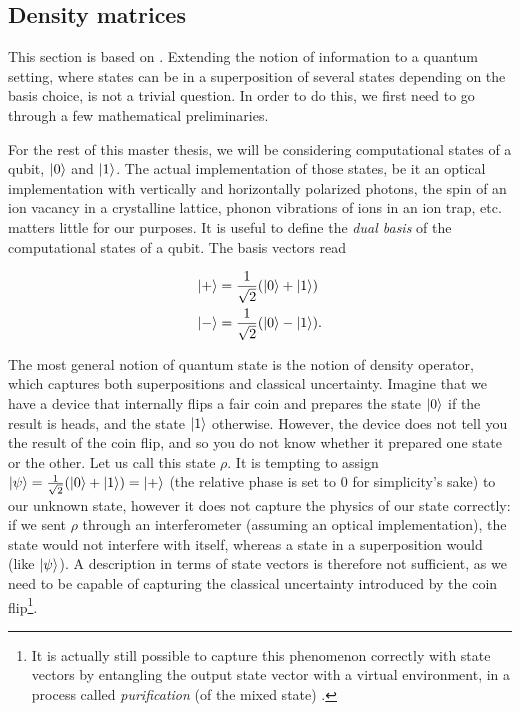 


\subsection{Density matrices} \label{sec:density_matrices}

This section is based on \cite[pp. 98-108]{nielsen_quantum_2010}. Extending the notion of information to a quantum setting, where states can be in a superposition of several states depending on the basis choice, is not a trivial question. In order to do this, we first need to go through a few mathematical preliminaries. 

For the rest of this master thesis, we will be considering computational states of a qubit, $\ket{0}$ and $\ket{1}$. The actual implementation of those states, be it an optical implementation with vertically and horizontally polarized photons, the spin of an ion vacancy in a crystalline lattice, phonon vibrations of ions in an ion trap, etc. matters little for our purposes. It is useful to define the \textit{dual basis} of the computational states of a qubit. The basis vectors read

\begin{align}
    \ket{+} &= \frac{1}{\sqrt{2}} (\ket{0} + \ket{1})\\
    \ket{-} &= \frac{1}{\sqrt{2}} (\ket{0} - \ket{1}).
\end{align}

The most general notion of quantum state is the notion of density operator, which captures both superpositions and classical uncertainty. Imagine that we have a device that internally flips a fair coin and prepares the state $\ket{0}$ if the result is heads, and the state $\ket{1}$ otherwise. However, the device does not tell you the result of the coin flip, and so you do not know whether it prepared one state or the other. Let us call this state $\rho$. It is tempting to assign $\ket{\psi} = \frac{1}{\sqrt{2}}(\ket{0} + \ket{1}) = \ket{+}$ (the relative phase is set to 0 for simplicity's sake) to our unknown state, however it does not capture the physics of our state correctly: if we sent $\rho$ through an interferometer (assuming an optical implementation), the state would not interfere with itself, whereas a state in a superposition would (like $\ket{\psi}$). A description in terms of state vectors is therefore not sufficient, as we need to be capable of capturing the classical uncertainty introduced by the coin flip\footnote{It is actually still possible to capture this phenomenon correctly with state vectors by entangling the output state vector with a virtual environment, in a process called \textit{purification} (of the mixed state) \cite[p. 110]{nielsen_quantum_2010}.}.

